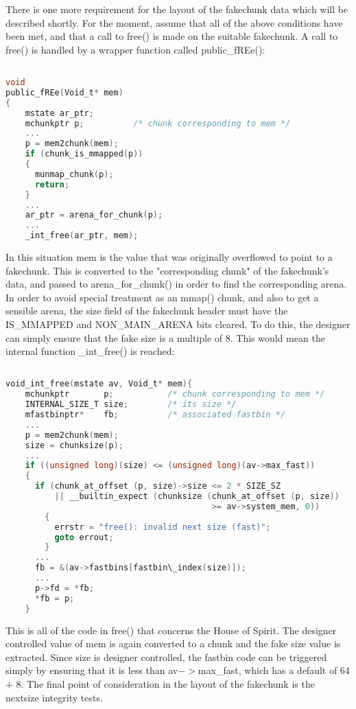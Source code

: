\documentclass[12pt]{article}
\begin{document}
There is one more requirement for the layout of the fakechunk data
which will be described shortly. For the moment, assume that all of
the above conditions have been met, and that a call to free() is
made on the suitable fakechunk. A call to free() is handled by a
wrapper function called public\_fREe():
\begin{lstlisting}[language=C]

void
public_fREe(Void_t* mem)
{
    mstate ar_ptr;
    mchunkptr p;          /* chunk corresponding to mem */
    ...
    p = mem2chunk(mem);
    if (chunk_is_mmapped(p))
    {
      munmap_chunk(p);
      return;
    }
    ...
    ar_ptr = arena_for_chunk(p);
    ...
    _int_free(ar_ptr, mem);
\end{lstlisting}
In this situation mem is the value that was originally overflowed
to point to a fakechunk. This is converted to the "corresponding
chunk" of the fakechunk's data, and passed to arena_for_chunk() in
order to find the corresponding arena. In order to avoid special
treatment as an mmap() chunk, and also to get a sensible arena, the
size field of the fakechunk header must have the IS_MMAPPED and
NON_MAIN_ARENA bits cleared. To do this, the designer can simply
ensure that the fake size is a multiple of 8. This would mean the
internal function _int_free() is reached:
\begin{lstlisting}[language=C]

void_int_free(mstate av, Void_t* mem){
    mchunkptr       p;           /* chunk corresponding to mem */
    INTERNAL_SIZE_T size;        /* its size */
    mfastbinptr*    fb;          /* associated fastbin */
    ...
    p = mem2chunk(mem);
    size = chunksize(p);
    ...
    if ((unsigned long)(size) <= (unsigned long)(av->max_fast))
    {
      if (chunk_at_offset (p, size)->size <= 2 * SIZE_SZ
          || __builtin_expect (chunksize (chunk_at_offset (p, size))
                                          >= av->system_mem, 0))
        {
          errstr = "free(): invalid next size (fast)";
          goto errout;
        }
      ...
      fb = &(av->fastbins[fastbin\_index(size)]);
      ...
      p->fd = *fb;
      *fb = p;
    }
\end{lstlisting}
This is all of the code in free() that concerns the House of
Spirit. The designer controlled value of mem is again converted to
a chunk and the fake size value is extracted. Since size is
designer controlled, the fastbin code can be triggered simply by
ensuring that it is less than av$->$max\_fast, which has a default of
64 + 8. The final point of consideration in the layout of the
fakechunk is the nextsize integrity tests.
\newline
\end{document}
